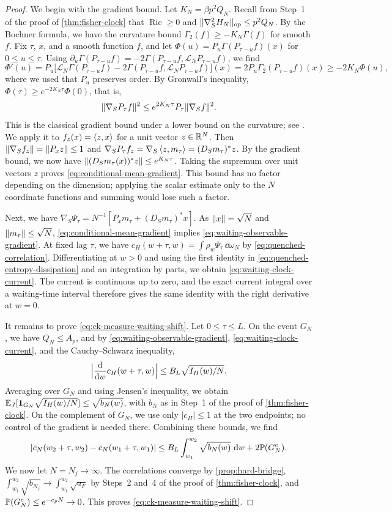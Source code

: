 \begin{proof}
We begin with the gradient bound. Let $K_N=\beta p^2Q_N$. Recall from Step~1 of the proof of \cref{thm:fisher-clock} that $\operatorname{Ric}\ge0$ and $\lVert\nabla_S^2H_N\rVert_{\mathrm{op}}\le p^2Q_N$. By the Bochner formula, we have the curvature bound $\Gamma_2(f)\ge-K_N\Gamma(f)$ for smooth $f$. Fix $\tau$, $x$, and a smooth function $f$, and let $\Phi(u)=P_u\Gamma(P_{\tau-u}f)(x)$ for $0\le u\le\tau$. Using $\partial_u\Gamma(P_{\tau-u}f)=-2\Gamma(P_{\tau-u}f,\mathcal L_NP_{\tau-u}f)$, we find
\[
 \Phi'(u)=P_u\bigl[\mathcal L_N\Gamma(P_{\tau-u}f)-2\Gamma(P_{\tau-u}f,\mathcal L_NP_{\tau-u}f)\bigr](x)
 =2P_u\Gamma_2(P_{\tau-u}f)(x)\ge-2K_N\Phi(u),
\]
where we used that $P_u$ preserves order. By Gronwall's inequality, $\Phi(\tau)\ge e^{-2K_N\tau}\Phi(0)$, that is,
\[
 \lVert\nabla_SP_\tau f\rVert^2\le e^{2K_N\tau}P_\tau\lVert\nabla_Sf\rVert^2.
\]
This is the classical gradient bound under a lower bound on the curvature; see \cite[Theorem~3.2.3, p.~144]{bgl2014}.
We apply it to $f_z(x)=\left\langle z,x\right\rangle$ for a unit vector $z\in\mathbb R^N$. Then $\lVert\nabla_Sf_z\rVert=\lVert P_xz\rVert\le1$ and $\nabla_SP_\tau f_z=\nabla_S\left\langle z,m_\tau\right\rangle=(D_Sm_\tau)^*z$. By the gradient bound, we now have $\lVert(D_Sm_\tau(x))^*z\rVert\le e^{K_N\tau}$. Taking the supremum over unit vectors $z$ proves \eqref{eq:conditional-mean-gradient}. This bound has no factor depending on the dimension; applying the scalar estimate only to the $N$ coordinate functions and summing would lose such a factor.

Next, we have $\nabla_S\Psi_\tau=N^{-1}[P_xm_\tau+(D_Sm_\tau)^*x]$. As $\lVert x\rVert=\sqrt N$ and $\lVert m_\tau\rVert\le\sqrt N$, \eqref{eq:conditional-mean-gradient} implies \eqref{eq:waiting-observable-gradient}. At fixed lag $\tau$, we have $c_H(w+\tau,w)=\int\rho_w\Psi_\tau\,\dd\omega_N$ by \eqref{eq:quenched-correlation}. Differentiating at $w>0$ and using the first identity in \eqref{eq:quenched-entropy-dissipation} and an integration by parts, we obtain \eqref{eq:waiting-clock-current}. The current is continuous up to zero, and the exact current integral over a waiting-time interval therefore gives the same identity with the right derivative at $w=0$.

It remains to prove \eqref{eq:ck-measure-waiting-shift}. Let $0\le\tau\le L$. On the event $G_N$, we have $Q_N\le A_p$, and by \eqref{eq:waiting-observable-gradient}, \eqref{eq:waiting-clock-current}, and the Cauchy--Schwarz inequality,
\[
 \Bigl|\frac{\mathop{}\!\mathrm d}{\mathop{}\!\mathrm d w}c_H(w+\tau,w)\Bigr|\le B_L\sqrt{I_H(w)/N}.
\]
Averaging over $G_N$ and using Jensen's inequality, we obtain $\mathbb E_J[\mathbf 1_{G_N}\sqrt{I_H(w)/N}]\le\sqrt{b_N(w)}$, with $b_N$ as in Step~1 of the proof of \cref{thm:fisher-clock}. On the complement of $G_N$, we use only $|c_H|\le1$ at the two endpoints; no control of the gradient is needed there. Combining these bounds, we find
\[
 |\bar c_N(w_2+\tau,w_2)-\bar c_N(w_1+\tau,w_1)|
 \le B_L\int_{w_1}^{w_2}\sqrt{b_N(w)}\,\mathop{}\!\mathrm d w+2\mathbb P(G_N^c).
\]
We now let $N=N_j\to\infty$. The correlations converge by \cref{prop:hard-bridge}, $\int_{w_1}^{w_2}\sqrt{b_{N_j}}\to\int_{w_1}^{w_2}\sqrt{a_F}$ by Steps~2 and~4 of the proof of \cref{thm:fisher-clock}, and $\mathbb P(G_N^c)\le e^{-c_pN}\to0$. This proves \eqref{eq:ck-measure-waiting-shift}.
\end{proof}

